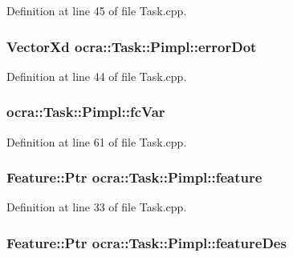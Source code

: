 Definition at line 45 of file Task.\+cpp.

\subsubsection[{\texorpdfstring{error\+Dot}{errorDot}}]{\setlength{\rightskip}{0pt plus 5cm}Vector\+Xd ocra\+::\+Task\+::\+Pimpl\+::error\+Dot}\hypertarget{structocra_1_1Task_1_1Pimpl_a58b49c44912e1f4f00c5c804530f6727}{}\label{structocra_1_1Task_1_1Pimpl_a58b49c44912e1f4f00c5c804530f6727}


Definition at line 44 of file Task.\+cpp.

\subsubsection[{\texorpdfstring{fc\+Var}{fcVar}}]{ ocra\+::\+Task\+::\+Pimpl\+::fc\+Var}\hypertarget{structocra_1_1Task_1_1Pimpl_ae95e699c5e631e1ec4e6d887b800f322}{}\label{structocra_1_1Task_1_1Pimpl_ae95e699c5e631e1ec4e6d887b800f322}


Definition at line 61 of file Task.\+cpp.

\subsubsection[{\texorpdfstring{feature}{feature}}]{\setlength{\rightskip}{0pt plus 5cm}Feature\+::\+Ptr ocra\+::\+Task\+::\+Pimpl\+::feature}\hypertarget{structocra_1_1Task_1_1Pimpl_a3f7bda3b477717e114b50b8ec9830455}{}\label{structocra_1_1Task_1_1Pimpl_a3f7bda3b477717e114b50b8ec9830455}


Definition at line 33 of file Task.\+cpp.

\subsubsection[{\texorpdfstring{feature\+Des}{featureDes}}]{\setlength{\rightskip}{0pt plus 5cm}Feature\+::\+Ptr ocra\+::\+Task\+::\+Pimpl\+::feature\+Des}\hypertarget{structocra_1_1Task_1_1Pimpl_aeaa68d51952ea53355e2f8789b691174}{}\label{structocra_1_1Task_1_1Pimpl_aeaa68d51952ea53355e2f8789b691174}


